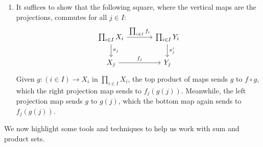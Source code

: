 \documentclass[Book-Poly]{subfiles}
\begin{document}
\begin{exercise}
\begin{solution}
\begin{enumerate}
            \item It suffices to show that the following square, where the vertical maps are the projections, commutes for all $j\in I$:
            \[
            \begin{tikzcd}[column sep=large]
                \prod_{i\in I}X_i \ar[d, "\pi_j"] \ar[r, "\prod_{i\in I}f_i"] & \prod_{i\in I}Y_i \ar[d, "\pi'_j"] \\
                X_j \ar[r, "f_j"] & Y_j
            \end{tikzcd}
            \]
            Given $g\colon(i\in I)\to X_i$ in $\prod_{i\in I}X_i$, the top product of maps sends $g$ to $f\circ g$, which the right projection map sends to $f_j(g(j))$.
            Meanwhile, the left projection map sends $g$ to $g(j)$, which the bottom map again sends to $f_j(g(j))$.
        \end{enumerate}
    \end{solution}
\end{exercise}

We now highlight some tools and techniques to help us work with sum and product sets.
\end{document}
